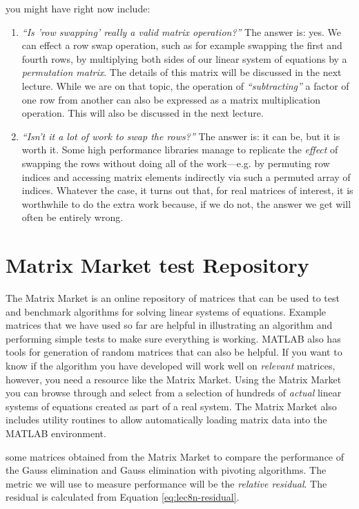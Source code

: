 you might have right now include:
\begin{enumerate}
\item \emph{``Is 'row swapping' really a valid matrix operation?''} The answer is: yes.  We can effect a row swap operation, such as for example swapping the first and fourth rows, by multiplying both sides of our linear system of equations by a \emph{permutation matrix}.  The details of this matrix will be discussed in the next lecture.  While we are on that topic, the operation of \emph{``subtracting''} a factor of one row from another can also be expressed as a matrix multiplication operation.  This will also be discussed in the next lecture.

\item \emph{``Isn't it a lot of work to swap the rows?''} The answer is: it can be, but it is worth it.  Some high performance libraries manage to replicate the \emph{effect} of swapping the rows without doing all of the work---e.g. by permuting row indices and accessing matrix elements indirectly via such a permuted array of indices.  Whatever the case, it turns out that, for real matrices of interest, it is worthwhile to do the extra work because, if we do not, the answer we get will often be entirely wrong.

\end{enumerate}

\section{Matrix Market test Repository}

The Matrix Market is an online repository of matrices that can be used to test and benchmark algorithms for solving linear systems of equations.\cite{MatrixMarket}  Example matrices that we have used so far are helpful in illustrating an algorithm and performing simple tests to make sure everything is working.  MATLAB also has tools for generation of random matrices that can also be helpful.  If you want to know if the algorithm you have developed will work well on \emph{relevant} matrices, however, you need a resource like the Matrix Market.  Using the Matrix Market you can browse through and select from a selection of hundreds of \emph{actual} linear systems of equations created as part of a real system.  The Matrix Market also includes utility routines to allow automatically loading matrix data into the MATLAB environment.

 some matrices obtained from the Matrix Market to compare the performance of the Gauss elimination and Gauss elimination with pivoting algorithms.  The metric we will use to measure performance will be the \emph{relative residual}.  The residual is calculated from Equation \ref{eq:lec8n-residual}.

